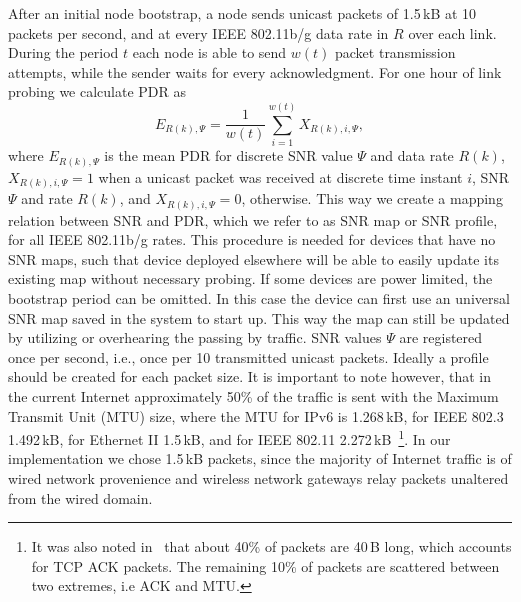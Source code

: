 \documentclass[11pt,draftclsnofoot,journal,onecolumn]{IEEEtran}
\begin{document}
After an initial node bootstrap, a node sends unicast packets of 1.5\,kB at 10 packets per second, and at every IEEE 802.11b/g data rate in $R$ over each link. During the period $t$ each node is able to send $w(t)$ packet transmission attempts, while the sender waits for every acknowledgment. For one hour of link probing we calculate PDR as
\begin{equation}
E_{R(k),\Psi}=\frac{1}{w(t)}\sum_{i=1}^{w(t)}X_{R(k),i,\Psi},
\label{eq:e_sj}
\end{equation}
where $E_{R(k),\Psi}$ is the mean PDR for discrete SNR value $\Psi$ and data rate $R(k)$, $X_{R(k),i,\Psi}=1$ when a unicast packet was received at discrete time instant $i$, SNR $\Psi$ and rate $R(k)$, and $X_{R(k),i,\Psi}=0$, otherwise. This way we create a mapping relation between SNR and PDR, which we refer to as SNR map or SNR profile, for all IEEE 802.11b/g rates. This procedure is needed for devices that have no SNR maps, such that device deployed elsewhere will be able to easily update its existing map without necessary probing. If some devices are power limited, the bootstrap period can be omitted. In this case the device can first use an universal SNR map saved in the system to start up. This way the map can still be updated by utilizing or overhearing the passing by traffic. SNR values $\Psi$ are registered once per second, i.e., once per 10 transmitted unicast packets. Ideally a profile should be created for each packet size. It is important to note however, that in the current Internet approximately 50\% of the traffic is sent with the Maximum Transmit Unit (MTU) size, where the MTU for IPv6 is 1.268\,kB, for IEEE 802.3 1.492\,kB, for Ethernet II 1.5\,kB, and for IEEE 802.11 2.272\,kB~\cite{Williamson_ic_2001}\footnote{It was also noted in~\cite{Williamson_ic_2001} that about 40\% of packets are 40\,B long, which accounts for TCP ACK packets. The remaining 10\% of packets are scattered between two extremes, i.e ACK and MTU.}. In our implementation we chose 1.5\,kB packets, since the majority of Internet traffic is of wired network provenience and wireless network gateways relay packets unaltered from the wired domain.
\end{document}
